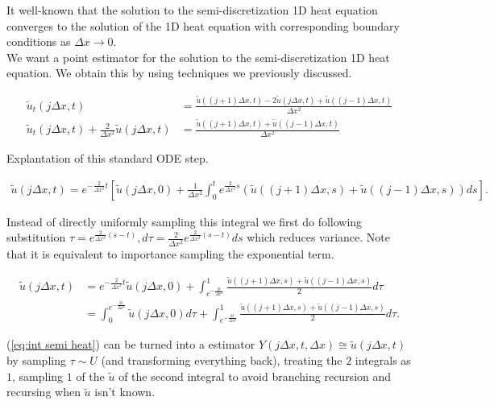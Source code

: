 \documentclass[a4paper,12pt]{article}
\begin{document}
It well-known that the solution to the semi-discretization 1D heat equation converges to the solution of the 1D heat equation with
corresponding boundary conditions as $\Delta x \rightarrow 0$. \\
We want a point estimator for the solution to the semi-discretization 1D heat equation. We obtain this by
using techniques we previously discussed.

\begin{align}
    \tilde{u}_t(j \Delta x,t)                                                 & = \frac{\tilde{u}((j+1) \Delta x, t)-2\tilde{u}(j \Delta x, t)+\tilde{u}((j-1) \Delta x, t)}{\Delta x^{2}} \\
    \tilde{u}_t(j \Delta x,t) + \frac{2}{\Delta x^{2}}\tilde{u}(j \Delta x,t) & = \frac{\tilde{u}((j+1) \Delta x, t)+\tilde{u}((j-1) \Delta x, t)}{\Delta x^{2}}
\end{align}

Explantation of this standard ODE step.

\begin{align}
    \tilde{u}(j \Delta x,t) = e^{-\frac{2}{\Delta x^{2}} t} \left[\tilde{u}(j \Delta x,0)
    + \frac{1}{\Delta x^{2}} \int_{0}^{t} e^{\frac{2}{\Delta x^{2}} s}
    (\tilde{u}((j+1) \Delta x,s)+\tilde{u}((j-1) \Delta x,s))ds  \right].
\end{align}

Instead of directly uniformly sampling this integral we first do following substitution
$\tau = e^{\frac{2}{\Delta x^{2}}(s-t)}, d\tau =\frac{2}{\Delta x^{2}}  e^{\frac{2}{\Delta x^{2}}(s-t)}ds $
which reduces variance. Note that it is equivalent to importance sampling
the exponential term.

\begin{align}
    \tilde{u}(j \Delta x,t) & = e^{-\frac{2}{\Delta x^{2}} t} \tilde{u}(j \Delta x,0)
    + \int_{e^{-\frac{2t}{\Delta x^{2}}}}^{1} \frac{\tilde{u}((j+1) \Delta x,s)+\tilde{u}((j-1) \Delta x,s)}{2}d\tau \nonumber \\
                            & = \int_{0}^{e^{-\frac{2t}{\Delta x^{2}}}}  \tilde{u}(j \Delta x,0) d\tau+
    \int_{e^{-\frac{2t}{\Delta x^{2}}}}^{1} \frac{\tilde{u}((j+1) \Delta x,s)+\tilde{u}((j-1) \Delta x,s)}{2}d\tau. \label{eq:int semi heat}
\end{align}

(\ref{eq:int semi heat}) can be turned into a estimator $Y(j \Delta x,t,\Delta x ) \cong  \tilde{u}(j \Delta x,t)$
by sampling $\tau \sim U$ (and transforming everything back), treating the $2$ integrals as $1$,
sampling $1$ of the $\tilde{u}$ of the second integral to avoid branching recursion and
recursing when $\tilde{u}$ isn't known.
\end{document}
